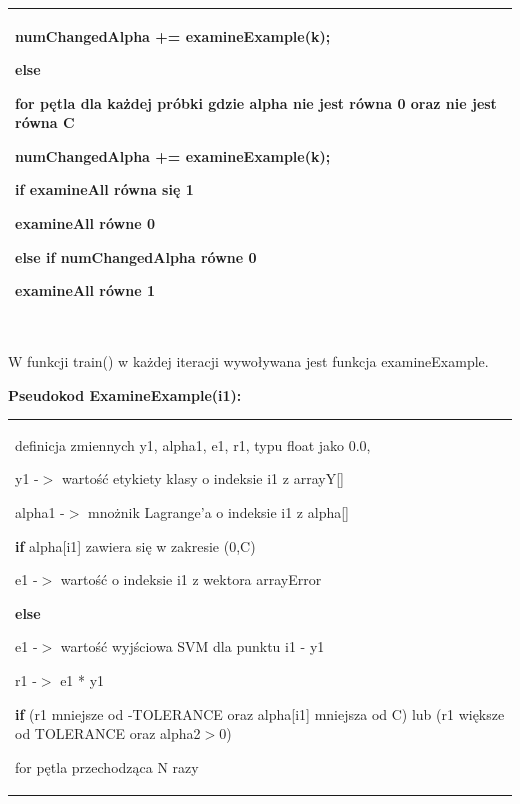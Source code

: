 \documentclass[[10pt,a4paper]{article}
\begin{document}
\begin{enumerate}
\begin{itemize}
\begin{tabular}{|p{11.5cm}|}
    \hspace{4em}numChangedAlpha += examineExample(k);

  \hspace{2em}\textbf{else}

   \hspace{3em}for pętla dla każdej próbki gdzie alpha nie jest równa 0 oraz nie jest równa C

   \hspace{4em}numChangedAlpha += examineExample(k);

  \hspace{2em}\textbf{if} examineAll równa si\k{e} 1

   \hspace{3em}examineAll równe 0

  \hspace{2em}\textbf{else if} numChangedAlpha równe 0 

   \hspace{3em}examineAll równe 1
\\ \hline
\end{tabular}
 \\ W funkcji train() w każdej iteracji wywoływana jest funkcja examineExample.

 
\newpage
\noindent 
\noindent \textbf{Pseudokod ExamineExample(i1):}\\
\begin{tabular}{|p{11.5cm}|} \hline
\noindent definicja zmiennych y1, alpha1, e1, r1, typu float jako 0.0,

\noindent y1 -$>$ warto\'{s}\'{c} etykiety klasy o indeksie i1 z arrayY[]

\noindent alpha1 -$>$ mnożnik Lagrange'a o indeksie i1 z alpha[]

\noindent 

\noindent \textbf{if} alpha[i1] zawiera się w zakresie (0,C)

 \hspace{1em}e1 -$>$ wartość o indeksie i1 z wektora arrayError

\noindent \textbf{else}

 \hspace{1em}e1 -$>$ wartość wyjściowa SVM dla punktu i1 - y1

\noindent r1 -$>$ e1 * y1

\noindent \textbf{if} (r1 mniejsze od -TOLERANCE oraz alpha[i1] mniejsza od C) lub (r1 większe od TOLERANCE oraz alpha2$>$0)

 \hspace{1em}for pętla przechodząca N razy


\end{tabular}
\end{itemize}
\end{enumerate}
\end{document}

